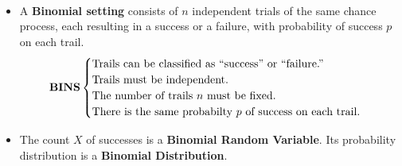 \documentclass[Main.tex]{subfiles}
\begin{document}
	\begin{example} \hfill \\
		\begin{itemize}
			\item A \textbf{Binomial setting} consists of $n$ independent trials of the same chance process, each resulting in a success or a failure, with probability of success $p$ on each trail.\hfill
			\begin{subequations}
				\begin{align}
				\text{\textbf{BINS}}
				\begin{cases}
				\text{Trails can be classified as ``success'' or ``failure.''}\\
				\text{Trails must be independent.}\\
				\text{The number of trails $n$ must be fixed.}\\
				\text{There is the same probabilty $p$ of success on each trail.} \notag
				\end{cases}
				\end{align}
			\end{subequations}\hfill
			
			\item The count $X$ of successes is a \textbf{Binomial Random Variable}. Its probability distribution is a \textbf{Binomial Distribution}.
		\end{itemize}
	\end{example}
	
\end{document}
